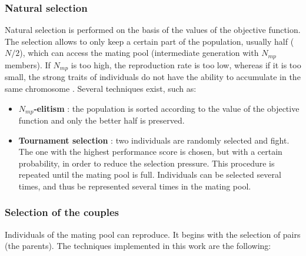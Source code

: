 \documentclass[twocol]{ametsoc}
\begin{document}
\subsubsection{Natural selection}

Natural selection is performed on the basis of the values of the objective function. The selection allows to only keep a certain part of the population, usually half ($N/2$), which can access the mating pool (intermediate generation with $N_{mp}$ members). If $N_{mp}$ is too high, the reproduction rate is too low, whereas if it is too small, the strong traits of individuals do not have the ability to accumulate in the same chromosome \citep{Haupt2004}. Several techniques exist, such as:

\begin{itemize}
	\item \textbf{$N_{mp}$-elitism} \citep{Michalewicz1996}: the population is sorted according to the value of the objective function and only the better half is preserved. 
	
	\item \textbf{Tournament selection} \citep{Michalewicz1996, Zitzler2004a}: two individuals are randomly selected and fight. The one with the highest performance score is chosen, but with a certain probability, in order to reduce the selection pressure. This procedure is repeated until the mating pool is full. Individuals can be selected several times, and thus be represented several times in the mating pool.
\end{itemize}


\subsubsection{Selection of the couples}

Individuals of the mating pool can reproduce. It begins with the selection of pairs (the parents). The techniques implemented in this work are the following:
\end{document}
